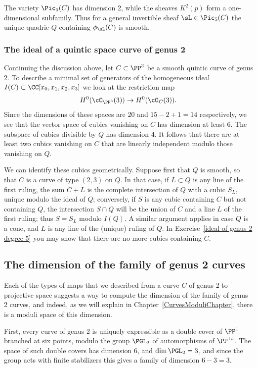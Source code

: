  The variety $\Pic_5(C)$ has dimension 2, while the sheaves
$K^2(p)$ form a one-dimensional subfamily.
Thus for a general invertible sheaf $\sL\in \Pic_5(C)$
the unique quadric $Q$ containing $\phi_\sL(C)$ is smooth.

\subsubsection*{The ideal of a quintic space curve of genus 2}
\label{genus 2 quintic}

Continuing the discussion above, let $C\subset \PP^3$ be a smooth quintic curve of genus 2.
To describe a minimal set of generators of the homogeneous ideal
$I(C) \subset \CC[x_0, x_1, x_2, x_3]$ we look at the
restriction map
$$
H^0(\cO_{\PP^3}(3)) \to H^0(\cO_C(3)).
$$
Since the dimensions of these spaces are 20 and $15-2+1 = 14$
respectively, we see that the vector space of cubics vanishing on $C$
has dimension at least 6.
The subspace of cubics divisible by $Q$ has dimension 4. It follows
that there are at least two cubics vanishing on $C$ that are linearly
independent modulo those vanishing on $Q$.

We can identify these cubics geometrically. Suppose first that $Q$
is smooth, so that $C$ is a curve of type $(2,3)$ on $Q$. In that
case, if $L \subset Q$ is any line of the first ruling, the sum $C+L$
is the complete intersection of $Q$ with a cubic $S_L$, unique modulo
the ideal of $Q$; conversely, if $S$ is any cubic containing $C$ but
not containing $Q$, the intersection $S \cap Q$ will be the union of
$C$ and a line $L$ of the first ruling; thus $S = S_L$
modulo $I(Q)$.
A
similar argument applies in case $Q$ is a cone, and $L$ is any line of
the (unique) ruling of $Q$. In Exercise~\ref{ideal of genus 2 degree 5}
you may show that there are no more cubics containing $C$.

\subsection*{The dimension of the family of genus 2 curves}

Each of the types of maps that we described from a curve $C$ of genus
%
2 to projective space suggests
a way to compute the dimension of the family of genus 2 curves, and
indeed, as we will explain in Chapter~\ref{CurvesModuliChapter}, there
is a moduli space of this dimension.

First,  every curve of genus 2 is uniquely expressible as a double
cover of $\PP^1$ branched at six points, modulo the group $\PGL_2$ of
automorphisms of $\PP^1` `$. The space of such double covers has dimension 6,
%
and $\dim\PGL_2 = 3$, and since the group acts with finite stabilizers
this gives a family of dimension $6-3 = 3$.

